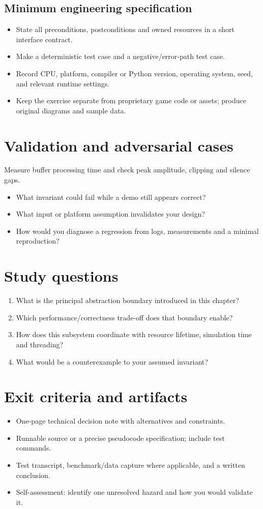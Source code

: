 \documentclass[11pt,letterpaper]{article}
\begin{document}
\subsection{Minimum engineering specification}
\begin{itemize}
\item State all preconditions, postconditions and owned resources in a short interface contract.
\item Make a deterministic test case and a negative/error-path test case.
\item Record CPU, platform, compiler or Python version, operating system, seed, and relevant runtime settings.
\item Keep the exercise separate from proprietary game code or assets; produce original diagrams and sample data.
\end{itemize}
\section{Validation and adversarial cases}
Measure buffer processing time and check peak amplitude, clipping and silence gaps.

\begin{itemize}
\item What invariant could fail while a demo still appears correct?
\item What input or platform assumption invalidates your design?
\item How would you diagnose a regression from logs, measurements and a minimal reproduction?
\end{itemize}
\section{Study questions}
\begin{enumerate}
\item What is the principal abstraction boundary introduced in this chapter?
\item Which performance/correctness trade-off does that boundary enable?
\item How does this subsystem coordinate with resource lifetime, simulation time and threading?
\item What would be a counterexample to your assumed invariant?
\end{enumerate}
\section{Exit criteria and artifacts}
\begin{itemize}
\item One-page technical decision note with alternatives and constraints.
\item Runnable source or a precise pseudocode specification; include test commands.
\item Test transcript, benchmark/data capture where applicable, and a written conclusion.
\item Self-assessment: identify one unresolved hazard and how you would validate it.
\end{itemize}
\end{document}
